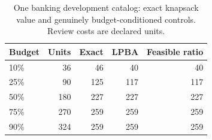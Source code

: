 \begin{table}[H]
\caption{One banking development catalog: exact knapsack value and genuinely budget-conditioned controls. Review costs are declared units.\label{tab:banking}}
\centering\small\renewcommand{\arraystretch}{1.08}
\begin{tabular}{lrrrr}
\toprule
Budget & Units & Exact & LPBA & Feasible ratio \\
\midrule
10\% & 36 & 46 & 40 & 40 \\
25\% & 90 & 125 & 117 & 117 \\
50\% & 180 & 227 & 227 & 227 \\
75\% & 270 & 259 & 259 & 259 \\
90\% & 324 & 259 & 259 & 259 \\
\bottomrule
\end{tabular}
\end{table}
